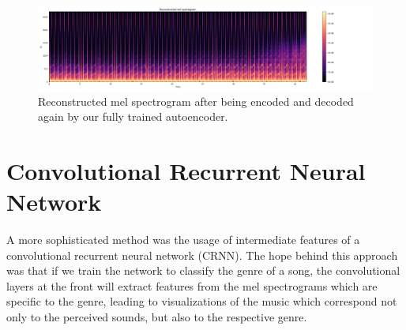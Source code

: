    \begin{figure}
        \centering
        \includegraphics[width=\textwidth, trim=10 0 220 0, clip]{images/recon_spec}
        \caption{Reconstructed mel spectrogram after being encoded and decoded again by our fully trained autoencoder.}
        \label{reconstructed}
    \end{figure}
    
\section{Convolutional Recurrent Neural Network}

    A more sophisticated method was the usage of intermediate features of a convolutional recurrent neural network (CRNN).
    The hope behind this approach was that if we train the network to classify the genre of a song, the convolutional layers at the front will extract features from the mel spectrograms which are specific to the genre, leading to visualizations of the music which correspond not only to the perceived sounds, but also to the respective genre.\\

